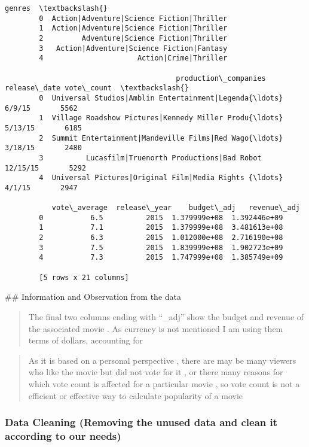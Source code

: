 \documentclass[11pt]{article}
\begin{document}
\begin{Verbatim}[commandchars=\\\{\}]
                                              genres  \textbackslash{}
        0  Action|Adventure|Science Fiction|Thriller   
        1  Action|Adventure|Science Fiction|Thriller   
        2         Adventure|Science Fiction|Thriller   
        3   Action|Adventure|Science Fiction|Fantasy   
        4                      Action|Crime|Thriller   
        
                                        production\_companies release\_date vote\_count  \textbackslash{}
        0  Universal Studios|Amblin Entertainment|Legenda{\ldots}       6/9/15       5562   
        1  Village Roadshow Pictures|Kennedy Miller Produ{\ldots}      5/13/15       6185   
        2  Summit Entertainment|Mandeville Films|Red Wago{\ldots}      3/18/15       2480   
        3          Lucasfilm|Truenorth Productions|Bad Robot     12/15/15       5292   
        4  Universal Pictures|Original Film|Media Rights {\ldots}       4/1/15       2947   
        
           vote\_average  release\_year    budget\_adj   revenue\_adj  
        0           6.5          2015  1.379999e+08  1.392446e+09  
        1           7.1          2015  1.379999e+08  3.481613e+08  
        2           6.3          2015  1.012000e+08  2.716190e+08  
        3           7.5          2015  1.839999e+08  1.902723e+09  
        4           7.3          2015  1.747999e+08  1.385749e+09  
        
        [5 rows x 21 columns]
\end{Verbatim}
            
    \#\# Information and Observation from the data

\begin{quote}
The final two columns ending with ``\_adj'' show the budget and revenue
of the associated movie . As currency is not mentioned I am using them
terms of dollars, accounting for
\end{quote}

\begin{quote}
As it is based on a personal perspective , there are may be many viewers
who like the movie but did not vote for it , or there many reasons for
which vote count is affected for a particular movie , so vote count is
not a efficient or effective way to calculate popularity of a movie
\end{quote}

\subsubsection{Data Cleaning (Removing the unused data and clean it
according to our
needs)}\label{data-cleaning-removing-the-unused-data-and-clean-it-according-to-our-needs}
\end{document}
